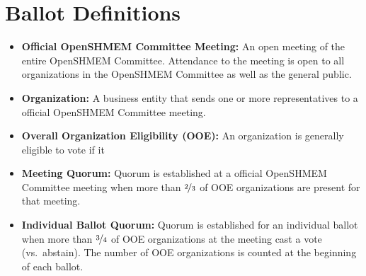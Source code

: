 \section{Ballot Definitions}

\begin{itemize}
\item {\bf Official OpenSHMEM Committee Meeting:} An open meeting of the entire
  OpenSHMEM Committee.  Attendance to the meeting is open to
  all organizations in the OpenSHMEM Committee as well as the general public.

\item {\bf Organization:} A business entity that sends one or more
  representatives to a official OpenSHMEM Committee meeting.

\item {\bf Overall Organization Eligibility (OOE):} An organization is
  generally eligible to vote if it

\item {\bf Meeting Quorum:} Quorum is established at a official OpenSHMEM
  Committee meeting when more than $\nicefrac{2}{3}$ of OOE organizations
  are present for that meeting.

\item {\bf Individual Ballot Quorum:} Quorum is established for an
  individual ballot when more than $\nicefrac{3}{4}$ of OOE
  organizations at the meeting cast a vote (vs.\ abstain).  The number
  of OOE organizations is counted at the beginning of each ballot.
\end{itemize}
